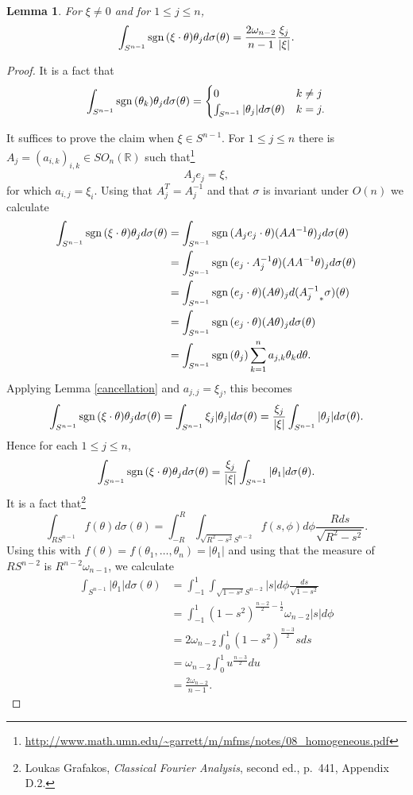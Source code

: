 \documentclass{article}
\newcommand{\sgn}{\ensuremath\mathrm{sgn}\,}
\newtheorem{lemma}[theorem]{Lemma}
\theoremstyle{definition}
\begin{document}
\begin{lemma}
For $\xi \neq 0$ and for $1 \leq j \leq n$,
\[
\int_{S^{n-1}} \sgn(\xi \cdot \theta) \theta_j d\sigma(\theta)    =\frac{2\omega_{n-2}}{n-1}
\frac{\xi_j}{|\xi|}.
\]
\label{spherical}
\end{lemma}
\begin{proof}
It is a fact that
\begin{equation}
\int_{S^{n-1}} \sgn(\theta_k)\theta_j d\sigma(\theta)=
\begin{cases}
0&k \neq j\\
\int_{S^{n-1}} |\theta_j| d\sigma(\theta)&k = j.
\end{cases}
\label{cancellation}
\end{equation}

It suffices to prove the claim when $\xi \in S^{n-1}$. For $1 \leq j \leq n$ there is 
$A_j=(a_{i,k})_{i,k} \in SO_n(\mathbb{R})$ such that\footnote{\url{http://www.math.umn.edu/~garrett/m/mfms/notes/08_homogeneous.pdf}}
\[
A_j e_j = \xi,
\]
for which $a_{i,j}=\xi_i$.
Using that $A_j^T=A_j^{-1}$ and that 
$\sigma$ is invariant under $O(n)$
 we calculate
\begin{align*}
\int_{S^{n-1}} \sgn(\xi\cdot \theta) \theta_j d\sigma(\theta)&=
\int_{S^{n-1}} \sgn(A_j e_j \cdot \theta) (AA^{-1} \theta)_j d\sigma(\theta)\\
&=\int_{S^{n-1}} \sgn(e_j \cdot A_j^{-1} \theta) (AA^{-1} \theta)_j d\sigma(\theta)\\
&=\int_{S^{n-1}} \sgn(e_j \cdot \theta) (A\theta)_j d({A_j^{-1}}_*\sigma)(\theta)\\
&=\int_{S^{n-1}} \sgn(e_j \cdot \theta) (A\theta)_j d\sigma(\theta)\\
&=\int_{S^{n-1}} \sgn(\theta_j)  \sum_{k=1}^n a_{j,k} \theta_k d\theta.
\end{align*}
Applying Lemma \ref{cancellation} and $a_{j,j}=\xi_j$, this becomes
\[
\int_{S^{n-1}} \sgn(\xi\cdot \theta) \theta_j d\sigma(\theta)=
\int_{S^{n-1}} \xi_j |\theta_j| d\sigma(\theta)
=\frac{\xi_j}{|\xi|} \int_{S^{n-1}} |\theta_j| d\sigma(\theta).
\]
Hence for each $1 \leq j \leq n$,
\[
\int_{S^{n-1}} \sgn(\xi\cdot \theta) \theta_j d\sigma(\theta)=
\frac{\xi_j}{|\xi|} \int_{S^{n-1}} |\theta_1| d\sigma(\theta).
\]
It is a fact that\footnote{Loukas Grafakos, {\em Classical Fourier Analysis}, second ed.,
p.~441, Appendix D.2.}
\[
\int_{RS^{n-1}} f(\theta) d\sigma(\theta) = 
\int_{-R}^R \int_{\sqrt{R^2-s^2} S^{n-2}} f(s,\phi) d\phi \frac{Rds}{\sqrt{R^2-s^2}}.
\]
Using this with $f(\theta)=f(\theta_1,\ldots,\theta_n)=|\theta_1|$ 
and using that the measure of $RS^{n-2}$ is
$R^{n-2} \omega_{n-1}$,
we calculate
\begin{align*}
\int_{S^{n-1}} |\theta_1| d\sigma(\theta)&=\int_{-1}^1 \int_{\sqrt{1-s^2}S^{n-2}} |s| d\phi \frac{ds}{\sqrt{1-s^2}}\\
&=\int_{-1}^1 (1-s^2)^{\frac{n-2}{2}-\frac{1}{2}} \omega_{n-2} |s| d\phi\\
&=2\omega_{n-2} \int_{0}^1 (1-s^2)^{\frac{n-3}{2}}s ds\\
&=\omega_{n-2} \int_0^1 u^{\frac{n-3}{2}} du\\
&=\frac{2\omega_{n-2}}{n-1}.
\end{align*}
\end{proof}
\end{document}
